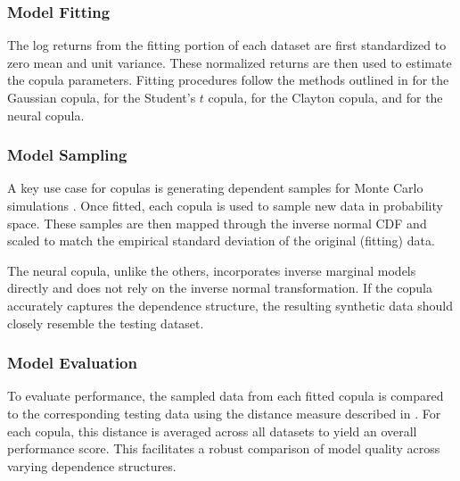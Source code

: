 \subsubsection{Model Fitting}
The log returns from the fitting portion of each dataset are first standardized to zero mean and unit variance. These normalized returns are then used to estimate the copula parameters. Fitting procedures follow the methods outlined in  for the Gaussian copula,  for the Student's $t$ copula,  for the Clayton copula, and  for the neural copula.


\subsubsection{Model Sampling}
A key use case for copulas is generating dependent samples for Monte Carlo simulations \citep[p.~40]{Nelsen2006}. Once fitted, each copula is used to sample new data in probability space. These samples are then mapped through the inverse normal CDF and scaled to match the empirical standard deviation of the original (fitting) data.

The neural copula, unlike the others, incorporates inverse marginal models directly and does not rely on the inverse normal transformation. If the copula accurately captures the dependence structure, the resulting synthetic data should closely resemble the testing dataset.

\subsubsection{Model Evaluation}
To evaluate performance, the sampled data from each fitted copula is compared to the corresponding testing data using the distance measure described in . For each copula, this distance is averaged across all datasets to yield an overall performance score. This facilitates a robust comparison of model quality across varying dependence structures.

